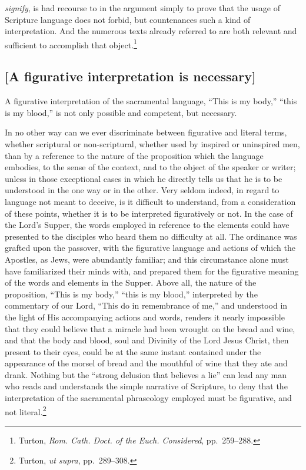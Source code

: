 \documentclass[
]{book}
\begin{document}
\emph{signify}, is had recourse to in the argument simply to prove that the usage of Scripture language does not forbid, but countenances such a kind of interpretation. And the numerous texts already referred to are both relevant and sufficient to accomplish that object.\footnote{Turton, \emph{Rom. Cath. Doct. of the Euch. Considered}, pp.~259--288.}

\hypertarget{a-figurative-interpretation-is-necessary}{%
\subsection{{[}A figurative interpretation is necessary{]}}\label{a-figurative-interpretation-is-necessary}}

A figurative interpretation of the sacramental language, ``This is my body,'' ``this is my blood,'' is not only possible and competent, but necessary.

In no other way can we ever discriminate between figurative and literal terms, whether scriptural or non-scriptural, whether used by inspired or uninspired men, than by a reference to the nature of the proposition which the language embodies, to the sense of the context, and to the object of the speaker or writer; unless in those exceptional cases in which he directly tells us that he is to be understood in the one way or in the other. Very seldom indeed, in regard to language not meant to deceive, is it difficult to understand, from a consideration of these points, whether it is to be interpreted figuratively or not. In the case of the Lord's Supper, the words employed in reference to the elements could have presented to the disciples who heard them no difficulty at all. The ordinance was grafted upon the passover, with the figurative language and actions of which the Apostles, as Jews, were abundantly familiar; and this circumstance alone must have familiarized their minds with, and prepared them for the figurative meaning of the words and elements in the Supper. Above all, the nature of the proposition, ``This is my body,'' ``this is my blood,'' interpreted by the commentary of our Lord, ``This do in remembrance of me,'' and understood in the light of His accompanying actions and words, renders it nearly impossible that they could believe that a miracle had been wrought on the bread and wine, and that the body and blood, soul and Divinity of the Lord Jesus Christ, then present to their eyes, could be at the same instant contained under the appearance of the morsel of bread and the mouthful of wine that they ate and drank. Nothing but the ``strong delusion that believes a lie'' can lead any man who reads and understands the simple narrative of Scripture, to deny that the interpretation of the sacramental phraseology employed must be figurative, and not literal.\footnote{Turton, \emph{ut supra}, pp.~289--308.}
\end{document}
